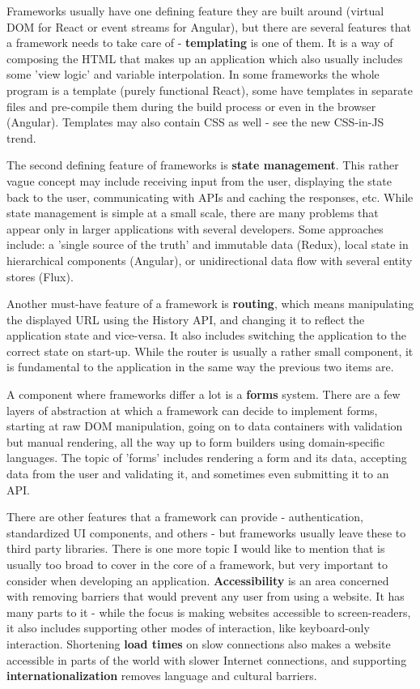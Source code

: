 \documentclass[english,odsaz]{fitthesis}
\begin{document}
Frameworks usually have one defining feature they are built around (virtual DOM
for React or event streams for Angular), but there are several features that a
framework needs to take care of - \textbf{templating} is one of them. It is a way of
composing the HTML that makes up an application which also usually includes some
'view logic' and variable interpolation. In some frameworks the whole program is
a template (purely functional React), some have templates in separate files and
pre-compile them during the build process or even in the browser
(Angular). Templates may also contain CSS as well - see the new CSS-in-JS trend.

The second defining feature of frameworks is \textbf{state management}. This rather vague
concept may include receiving input from the user, displaying the state back to
the user, communicating with APIs and caching the responses, etc. While state
management is simple at a small scale, there are many problems that appear only
in larger applications with several developers. Some approaches include: a
'single source of the truth' and immutable data (Redux), local state in
hierarchical components (Angular), or unidirectional data flow with several
entity stores (Flux).

Another must-have feature of a framework is \textbf{routing}, which means manipulating
the displayed URL using the History API, and changing it to reflect the
application state and vice-versa. It also includes switching the application to
the correct state on start-up. While the router is usually a rather small
component, it is fundamental to the application in the same way the previous two
items are.

A component where frameworks differ a lot is a \textbf{forms} system. There are a few
layers of abstraction at which a framework can decide to implement forms,
starting at raw DOM manipulation, going on to data containers with validation
but manual rendering, all the way up to form builders using domain-specific
languages. The topic of 'forms' includes rendering a form and its data,
accepting data from the user and validating it, and sometimes even submitting it
to an API.

There are other features that a framework can provide - authentication,
standardized UI components, and others - but frameworks usually leave these to
third party libraries. There is one more topic I would like to mention that is
usually too broad to cover in the core of a framework, but very important to
consider when developing an application. \textbf{Accessibility} is an area concerned with
removing barriers that would prevent any user from using a website. It has many
parts to it - while the focus is making websites accessible to screen-readers,
it also includes supporting other modes of interaction, like keyboard-only
interaction. Shortening \textbf{load times} on slow connections also makes a website
accessible in parts of the world with slower Internet connections, and
supporting \textbf{internationalization} removes language and cultural barriers.
\end{document}
